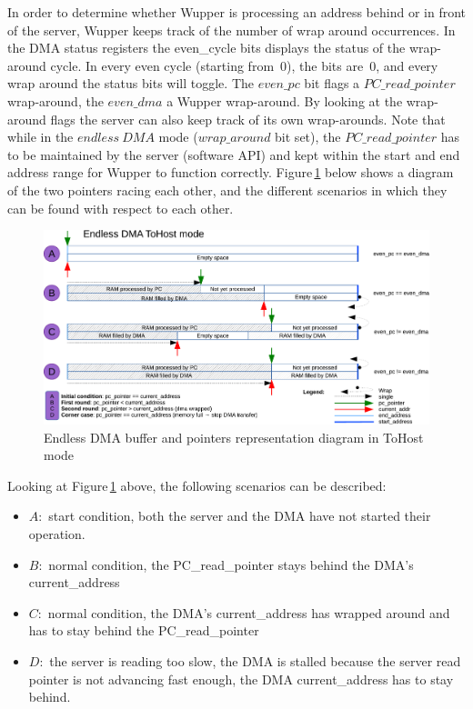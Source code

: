 In order to determine whether Wupper is processing an address behind or in front of the server, Wupper keeps track of the number of wrap around occurrences. In the DMA status registers the even\_cycle bits displays the status of the wrap-around cycle. In every even cycle (starting from~0), the bits are~0, and every wrap around the status bits will toggle. The $even\_pc$ bit flags a $PC\_read\_pointer$ wrap-around, the $even\_dma$ a Wupper wrap-around. By looking at the wrap-around flags the server can also keep track of its own wrap-arounds. Note that while in the $endless\ DMA$ mode ($wrap\_around$ bit set), the $PC\_read\_pointer$ has to be maintained by the server (software API) and kept within the start and end address range for Wupper to function correctly. Figure\,\ref{fig:endless_dma_diagram_tohost} below shows a diagram of the two pointers racing each other, and the different scenarios in which they can be found with respect to each other.
\newpage
\begin{figure}[H]
	\centering
	\includegraphics[width=1\textwidth, page=1]{figures/Endless_DMA_diagram.pdf}
	\caption{Endless DMA buffer and pointers representation diagram in ToHost mode}
	\label{fig:endless_dma_diagram_tohost}
\end{figure}

Looking at Figure\,\ref{fig:endless_dma_diagram_tohost} above, the following scenarios can be described:
\begin{itemize}\itemsep-5pt
	\item $A:$ start condition, both the server and the DMA have not started their operation.
	\item $B:$ normal condition, the PC\_read\_pointer stays behind the DMA's current\_address
	\item $C:$ normal condition, the DMA's current\_address has wrapped around and has to stay behind the PC\_read\_pointer
	\item $D:$ the server is reading too slow, the DMA is stalled because the server read pointer is not advancing fast enough, the DMA current\_address has to stay behind.
\end{itemize}

